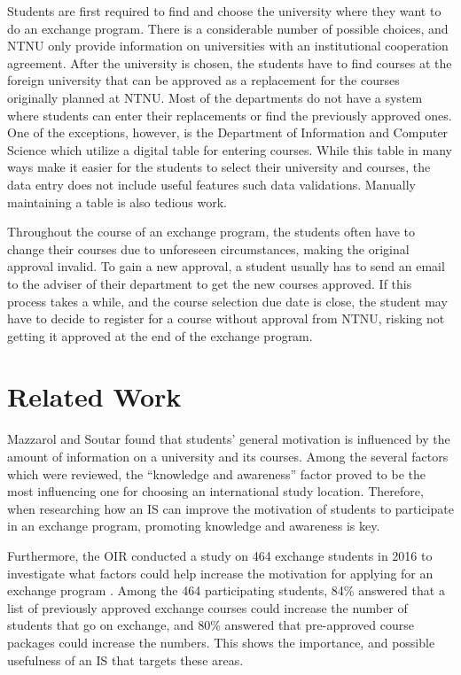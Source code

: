 
Students are first required to find and choose the university where they want to do an exchange program. There is a considerable number of possible choices, and NTNU only provide information on universities with an institutional cooperation agreement. After the university is chosen, the students have to find courses at the foreign university that can be approved as a replacement for the courses originally planned at NTNU. Most of the departments do not have a system where students can enter their replacements or find the previously approved ones. One of the exceptions, however, is the Department of Information and Computer Science which utilize a digital table for entering courses. While this table in many ways make it easier for the students to select their university and courses, the data entry does not include useful features such data validations. Manually maintaining a table is also tedious work. 

Throughout the course of an exchange program, the students often have to change their courses due to unforeseen circumstances, making the original approval invalid. To gain a new approval, a student usually has to send an email to the adviser of their department to get the new courses approved. If this process takes a while, and the course selection due date is close, the student may have to decide to register for a course without approval from NTNU, risking not getting it approved at the end of the exchange program.

\section{Related Work} \label{related_work}

Mazzarol and Soutar \cite{mazzarol2002push} found that students' general motivation is influenced by the amount of information on a university and its courses. Among the several factors which were reviewed, the \enquote{knowledge and awareness} factor proved to be the most influencing one for choosing an international study location. Therefore, when researching how an IS can improve the motivation of students to participate in an exchange program, promoting knowledge and awareness is key. 

Furthermore, the OIR conducted a study on 464 exchange students in 2016 to investigate what factors could help increase the motivation for applying for an exchange program \cite{intersek_report}. Among the 464 participating students, 84\% answered that a list of previously approved exchange courses could increase the number of students that go on exchange, and 80\% answered that pre-approved course packages could increase the numbers. This shows the importance, and possible usefulness of an IS that targets these areas.  

